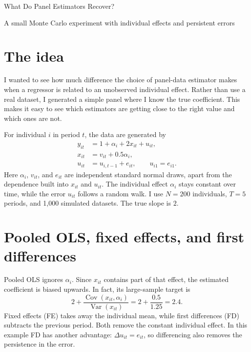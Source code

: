 \documentclass[10pt,a4paper]{article}
\begin{document}
\begin{center}
{\Large What Do Panel Estimators Recover?\par}
\vspace{5pt}
{\normalsize A small Monte Carlo experiment with individual effects and persistent errors\par}
\end{center}
\vspace{4pt}

\section{The idea}
I wanted to see how much difference the choice of panel-data estimator makes when a regressor is related to an unobserved individual effect. Rather than use a real dataset, I generated a simple panel where I know the true coefficient. This makes it easy to see which estimators are getting close to the right value and which ones are not.

For individual $i$ in period $t$, the data are generated by
\begin{align}
 y_{it} &= 1+\alpha_i+2x_{it}+u_{it},\\
 x_{it} &= v_{it}+0.5\alpha_i,\\
 u_{it} &= u_{i,t-1}+e_{it}, \qquad u_{i1}=e_{i1}.
\end{align}
Here $\alpha_i$, $v_{it}$, and $e_{it}$ are independent standard normal draws, apart from the dependence built into $x_{it}$ and $u_{it}$. The individual effect $\alpha_i$ stays constant over time, while the error $u_{it}$ follows a random walk. I use $N=200$ individuals, $T=5$ periods, and 1,000 simulated datasets. The true slope is $2$.

\section{Pooled OLS, fixed effects, and first differences}
Pooled OLS ignores $\alpha_i$. Since $x_{it}$ contains part of that effect, the estimated coefficient is biased upwards. In fact, its large-sample target is
\begin{equation}
 2+\frac{\operatorname{Cov}(x_{it},\alpha_i)}{\operatorname{Var}(x_{it})}
 =2+\frac{0.5}{1.25}=2.4.
\end{equation}
Fixed effects (FE) takes away the individual mean, while first differences (FD) subtracts the previous period. Both remove the constant individual effect. In this example FD has another advantage: $\Delta u_{it}=e_{it}$, so differencing also removes the persistence in the error.
\end{document}
